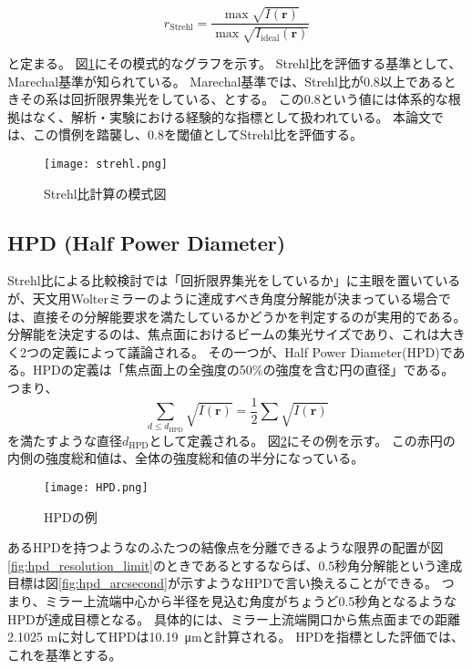 \[
r_{\mathrm{Strehl}} = \frac{ \max{\sqrt{I(\mathbf{r})} } }{ \max{ \sqrt{I_{\mathrm{ideal}}( \mathbf{r} )} } }
\]

と定まる。
図\ref{fig:strehl_explanation}にその模式的なグラフを示す。
Strehl比を評価する基準として、Marechal基準\cite{BornWolf:1999:Book}が知られている。
Marechal基準では、Strehl比が0.8以上であるときその系は回折限界集光をしている、とする。
この0.8という値には体系的な根拠はなく、解析・実験における経験的な指標として扱われている。
本論文では、この慣例を踏襲し、0.8を閾値としてStrehl比を評価する。

\begin{figure}[h]
\centering
\texttt{[image: strehl.png]}
\caption{Strehl比計算の模式図}
\label{fig:strehl_explanation}
\end{figure}

\subsection{HPD (Half Power Diameter)}
\label{chap2_hpd}

Strehl比による比較検討では「回折限界集光をしているか」に主眼を置いているが、天文用Wolterミラーのように達成すべき角度分解能が決まっている場合では、直接その分解能要求を満たしているかどうかを判定するのが実用的である。
分解能を決定するのは、焦点面におけるビームの集光サイズであり、これは大きく2つの定義によって議論される。
その一つが、Half Power Diameter(HPD)である。HPDの定義は「焦点面上の全強度の50\%の強度を含む円の直径」である。つまり、
\[
    \sum_{d\leq d_{\mathrm{HPD}}} \sqrt{ I(\mathbf{r}) } = \frac{1}{2} \sum \sqrt{ I(\mathbf{r}) }
\]
を満たすような直径$d_{\mathrm{HPD}}$として定義される。
図\ref{fig:hpd_explanation}にその例を示す。
この赤円の内側の強度総和値は、全体の強度総和値の半分になっている。

\begin{figure}[!ht]
\centering
\texttt{[image: HPD.png]}
\caption{HPDの例}
\label{fig:hpd_explanation}
\end{figure}

あるHPDを持つようなのふたつの結像点を分離できるような限界の配置が図\ref{fig:hpd_resolution_limit}のときであるとするならば、0.5秒角分解能という達成目標は図\ref{fig:hpd_arcsecond}が示すようなHPDで言い換えることができる。
つまり、ミラー上流端中心から半径を見込む角度がちょうど0.5秒角となるようなHPDが達成目標となる。
具体的には、ミラー上流端開口から焦点面までの距離2.1025 mに対してHPDは\SI{10.19}{\micro \metre}と計算される。
HPDを指標とした評価では、これを基準とする。

